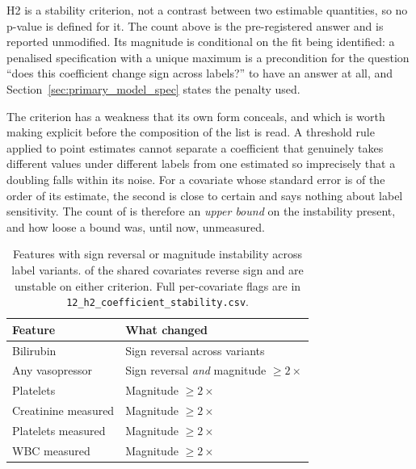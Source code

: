 H2 is a stability criterion, not a contrast between two estimable quantities,
so no p-value is defined for it. The count above is the pre-registered answer
and is reported unmodified. Its magnitude is conditional on the fit being
identified: a penalised specification with a unique maximum is a precondition
for the question ``does this coefficient change sign across labels?'' to have
an answer at all, and Section~\ref{sec:primary_model_spec} states the penalty
used.

The criterion has a weakness that its own form conceals, and which is worth
making explicit before the composition of the list is read. A threshold rule
applied to point estimates cannot separate a coefficient that genuinely takes
different values under different labels from one estimated so imprecisely that
a doubling falls within its noise. For a covariate whose standard error is of
the order of its estimate, the second is close to certain and says nothing
about label sensitivity. The count of \pcHTwoEst{} is therefore an
\emph{upper bound} on the instability present, and how loose a bound was, until
now, unmeasured.

\begin{table}[H]
    \centering
    \begin{tabular}{lp{8cm}}
        \toprule
        \textbf{Feature}           & \textbf{What changed}                   \\
        \midrule
        Bilirubin                  & Sign reversal across variants           \\
        Any vasopressor            & Sign reversal \emph{and} magnitude $\geq 2\times$ \\
        Platelets                  & Magnitude $\geq 2\times$                \\
        Creatinine measured        & Magnitude $\geq 2\times$                \\
        Platelets measured         & Magnitude $\geq 2\times$                \\
        WBC measured               & Magnitude $\geq 2\times$                \\
        \bottomrule
    \end{tabular}
    \caption{Features with sign reversal or magnitude instability across label
    variants. \pcHTwoNSign{} of the \pcHTwoNTerms{} shared covariates reverse
    sign and \pcHTwoEst{} are unstable on either criterion. Full per-covariate
    flags are in \texttt{12\_h2\_coefficient\_stability.csv}.}
    \label{tab:coef_instability}
\end{table}

